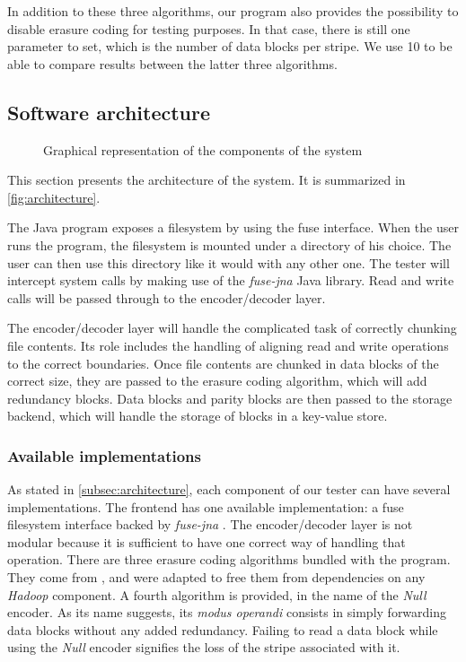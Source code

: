 In addition to these three algorithms, our program also provides the possibility to disable erasure coding for testing purposes.
In that case, there is still one parameter to set, which is the number of data blocks per stripe.
We use 10 to be able to compare results between the latter three algorithms.

\subsection{Software architecture}
\label{subsec:architecture}

\begin{figure}
	\centering
	
	\caption{Graphical representation of the components of the system}
	\label{fig:architecture}
\end{figure}

This section presents the architecture of the system.
It is summarized in \autoref{fig:architecture}.

The Java program exposes a filesystem by using the \ac{fuse} interface.
When the user runs the program, the filesystem is mounted under a directory of his choice.
The user can then use this directory like it would with any other one.
The tester will intercept system calls by making use of the \textit{fuse-jna} \autocite{fuse-jna} Java library.
Read and write calls will be passed through to the encoder/decoder layer.

The encoder/decoder layer will handle the complicated task of correctly chunking file contents.
Its role includes the handling of aligning read and write operations to the correct boundaries.
Once file contents are chunked in data blocks of the correct size, they are passed to the erasure coding algorithm, which will add redundancy blocks.
Data blocks and parity blocks are then passed to the storage backend, which will handle the storage of blocks in a key-value store.

\subsubsection{Available implementations}

As stated in \autoref{subsec:architecture}, each component of our tester can have several implementations.
The frontend has one available implementation: a \ac{fuse} filesystem interface backed by \textit{fuse-jna} \autocite{fuse-jna}.
The encoder/decoder layer is not modular because it is sufficient to have one correct way of handling that operation.
There are three erasure coding algorithms bundled with the program.
They come from \autocite{XorbasVLDB}, and were adapted to free them from dependencies on any \textit{Hadoop} component.
A fourth algorithm is provided, in the name of the \textit{Null} encoder.
As its name suggests, its \textit{modus operandi} consists in simply forwarding data blocks without any added redundancy.
Failing to read a data block while using the \textit{Null} encoder signifies the loss of the stripe associated with it.

